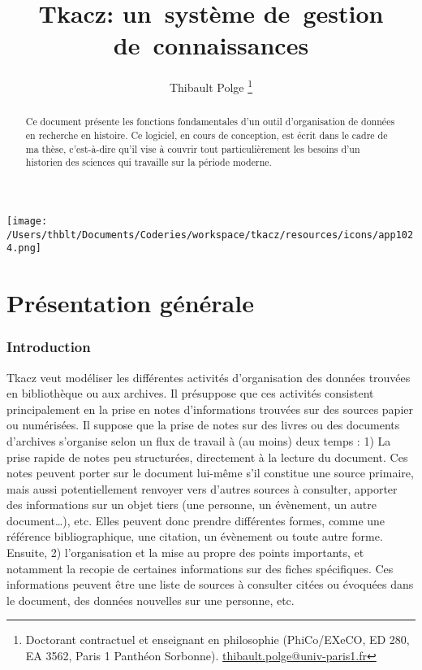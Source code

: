\documentclass[11pt,french]{article}
\begin{document}
\title{Tkacz: un~système de~gestion de~connaissances}


\author{Thibault Polge%
\thanks{Doctorant contractuel et enseignant en philosophie (PhiCo/EXeCO, ED
280, EA 3562, Paris 1 Panthéon Sorbonne). \protect\href{http://mailto:thibault.polge@univ-paris1.fr}{thibault.polge@univ-paris1.fr}%
}}
\maketitle
\begin{abstract}
Ce document présente les fonctions fondamentales d'un outil d'organisation
de données en recherche en histoire. Ce logiciel, en cours de conception,
est écrit dans le cadre de ma thèse, c'est-à-dire qu'il vise à couvrir
tout particulièrement les besoins d'un historien des sciences qui
travaille sur la période moderne.
\end{abstract}
\begin{center}\texttt{[image: /Users/thblt/Documents/Coderies/workspace/tkacz/resources/icons/app1024.png]}\end{center}

\bigskip\begin{spacing}{.7}
\makeatletter
\makeatother
\end{spacing}\clearpage


\part{Présentation générale}


\section{Introduction}

Tkacz veut modéliser les différentes activités d'organisation des
données trouvées en bibliothèque ou aux archives. Il présuppose que
ces activités consistent principalement en la prise en notes d'informations
trouvées sur des sources papier ou numérisées. Il suppose que la prise
de notes sur des livres ou des documents d'archives s'organise selon
un flux de travail à (au moins) deux temps : 1) La prise rapide de
notes peu structurées, directement à la lecture du document. Ces notes
peuvent porter sur le document lui-même s'il constitue une source
primaire, mais aussi potentiellement renvoyer vers d'autres sources
à consulter, apporter des informations sur un objet tiers (une personne,
un évènement, un autre document…), etc. Elles peuvent donc prendre
différentes formes, comme une référence bibliographique, une citation,
un évènement ou toute autre forme. Ensuite, 2) l'organisation et la
mise au propre des points importants, et notamment la recopie de certaines
informations sur des fiches spécifiques. Ces informations peuvent
être une liste de sources à consulter citées ou évoquées dans le document,
des données nouvelles sur une personne, etc.
\end{document}
